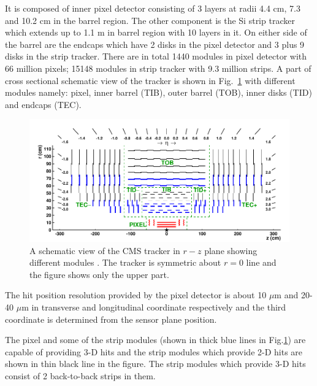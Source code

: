 It is composed of inner pixel detector consisting of 3 layers at radii 4.4 cm, 7.3 and 10.2 cm in the barrel region. The other component 
is the Si strip tracker which extends up to 1.1 m in barrel region with 10 layers in it. On either side of the barrel are the endcaps 
which have 2 disks in the pixel detector and 3 plus 9 disks in the strip tracker. There are in total 1440 modules in pixel detector with 
66 million pixels; 15148 modules in strip tracker with 9.3 million strips. A part of cross sectional schematic view of the tracker 
\cite{Collaboration_2014} is shown in Fig.~\ref{fig:Tracker} with different modules namely: pixel, inner barrel (TIB), outer barrel (TOB), 
inner disks (TID) and endcaps (TEC). 
\begin{figure}[h!]
\centering
\includegraphics[width=0.95\linewidth]{../Figures/Chap2/Tracker}
\caption[CMS tracker]{A schematic view of the CMS tracker in $r-z$ plane showing different modules \cite{Collaboration_2014}. The tracker is symmetric about $r=0$ line and the figure shows only the upper part.}
\label{fig:Tracker}
\end{figure}
The hit position resolution provided by the pixel detector is about 10 $\mu$m and 20-40 $\mu$m in transverse and longitudinal coordinate respectively and the third coordinate is determined from the sensor plane position.

The pixel and some of the strip modules (shown in thick blue lines in Fig.\ref{fig:Tracker}) are capable of providing 3-D hits and the 
strip modules which provide 2-D hits are shown in thin black line in the figure. The strip modules which provide 3-D hits consist of 2 
back-to-back strips in them.

